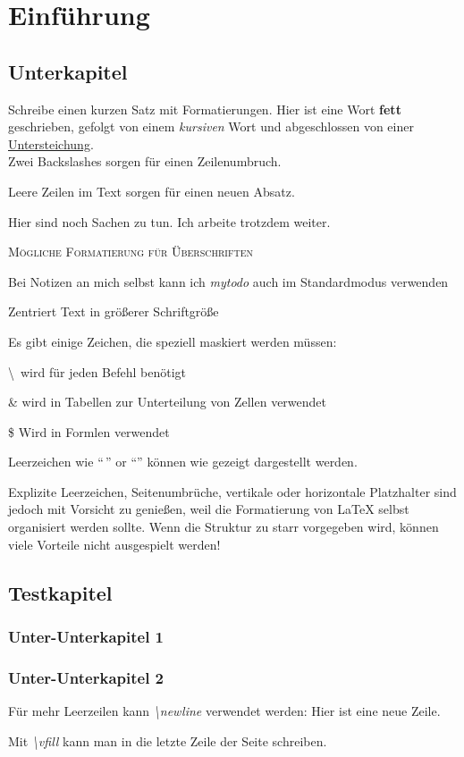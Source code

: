\chapter{Einführung}
\label{sec:einfuehrung}

\section{Unterkapitel}
\label{sec:unterkapitel}

Schreibe einen kurzen Satz mit Formatierungen. Hier ist eine Wort \textbf{fett} geschrieben, gefolgt von einem \textit{kursiven} Wort und abgeschlossen von einer \underline{Untersteichung}.\\
Zwei Backslashes sorgen für einen Zeilenumbruch. 

Leere Zeilen im Text sorgen für einen neuen Absatz.

Hier sind noch Sachen zu tun.  Ich arbeite trotzdem weiter.

\textsc{Mögliche Formatierung für Überschriften} 

Bei Notizen an mich selbst kann ich \textit{mytodo} auch im Standardmodus verwenden  

\begin{center}
\huge Zentriert Text in größerer Schriftgröße
\end{center}

Es gibt einige Zeichen, die speziell maskiert werden müssen: 

\textbackslash \, wird für jeden Befehl benötigt

\& wird in Tabellen zur Unterteilung von Zellen verwendet

\$ Wird in Formlen verwendet

Leerzeichen wie "`\,"' or "`\quad"' können wie gezeigt dargestellt werden.

Explizite Leerzeichen, Seitenumbrüche, vertikale oder horizontale Platzhalter sind jedoch mit Vorsicht zu genießen, weil die Formatierung von LaTeX selbst organisiert werden sollte. Wenn die Struktur zu starr vorgegeben wird, können viele Vorteile nicht ausgespielt werden!

\section{Testkapitel}
\label{sec:testkapitel}

\subsection{Unter-Unterkapitel 1}
\label{sec:unter-unterkapitel1}

\subsection{Unter-Unterkapitel 2}
\label{sec:unter-unterkapitel2}

Für mehr Leerzeilen kann \textit{\textbackslash newline} verwendet werden: \newline \newline \newline Hier ist eine neue Zeile.

\vfill

Mit \textit{\textbackslash vfill} kann man in die letzte Zeile der Seite schreiben.
